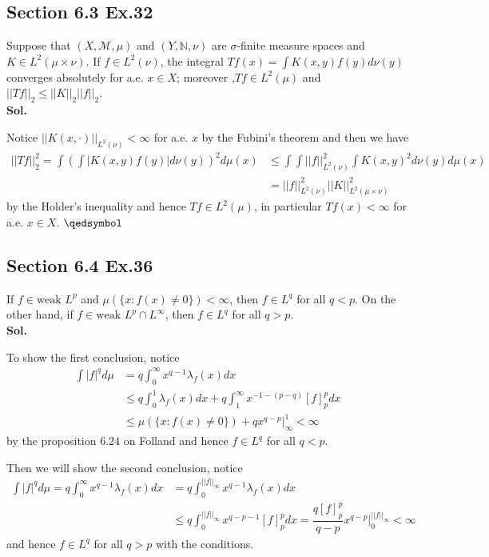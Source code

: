 \documentclass[lang=en,11pt,a4paper,citestyle =authoryear]{elegantpaper}
\newcommand{\prvd}{$\hfill \qedsymbol$}
\newcommand{\N}{\mathbb{N}}
\newcommand{\M}{\mathcal{M}}
\begin{document}
\subsection*{Section 6.3 Ex.32} 
Suppose that $(X,\M,\mu)$ and $(Y,\N,\nu)$ are $\sigma$-finite measure spaces and $K\in L^2(\mu\times\nu)$. If $f\in L^2(\nu)$, the integral $Tf(x) = \int K(x,y)f(y)d\nu(y)$ converges absolutely for a.e. $x\in X$; moreover ,$Tf \in L^2(\mu)$ and $||Tf||_2 \leq ||K||_2||f||_2$.
\vspace{0.5em}\\
\textbf{Sol.} \par
Notice $||K(x,\cdot)||_{L^2(\nu)} < \infty$ for a.e. $x$ by the Fubini's theorem and then we have
\[
\begin{aligned}
||Tf||_2^2 = \int (\int |K(x,y)f(y)| d\nu(y))^2 d\mu(x) &\leq \int \int ||f||^2_{L^2(\nu)} \int K(x,y)^2 d\nu(y) d\mu(x) \\ &= ||f||_{L^2(\nu)}^2 ||K||_{L^2(\mu\times\nu)}^2
\end{aligned}
\]
by the Holder's inequality and hence $Tf \in L^2(\mu)$, in particular $Tf(x) < \infty$ for a.e. $x\in X$.
\prvd
\vspace{0.5em}

\subsection*{Section 6.4 Ex.36} 
If $f\in \text{weak }L^p$ and $\mu(\{x:f(x)\neq 0\}) < \infty$, then $f\in L^q$ for all $q<p$. On the other hand, if $f\in\text{weak }L^p \cap L^{\infty}$, then $f\in L^q$ for all $q>p$.
\vspace{0.5em}\\
\textbf{Sol.} \par
To show the first conclusion, notice
\[
\begin{aligned}
\int |f|^q d\mu &=q\int_0^{\infty} x^{q-1}\lambda_f(x)dx \\ 
& \leq q\int_0^{1} \lambda_f(x)dx + q\int_1^{\infty} x^{-1-(p-q)}[f]_p^pdx \\
& \leq \mu(\{x:f(x)\neq 0\}) + qx^{q-p}|^{1}_{\infty} < \infty
\end{aligned}
\]
by the proposition 6.24 on Folland and hence $f\in L^q$ for all $q<p$.\par
Then we will show the second conclusion, notice
\[
\begin{aligned}
\int |f|^q d\mu = q\int_0^{\infty} x^{q-1}\lambda_f(x)dx &= q\int_0^{||f||_{\infty}} x^{q-1}\lambda_f(x)dx \\
&\leq q\int_0^{||f||_{\infty}} x^{q-p-1}[f]_p^pdx = \dfrac{q[f]_p^p}{q-p}x^{q-p}|^{||f||_{\infty}}_0 < \infty
\end{aligned}
\]
and hence $f\in L^q$ for all $q>p$ with the conditions.
\vspace{0.5em}
\end{document}
